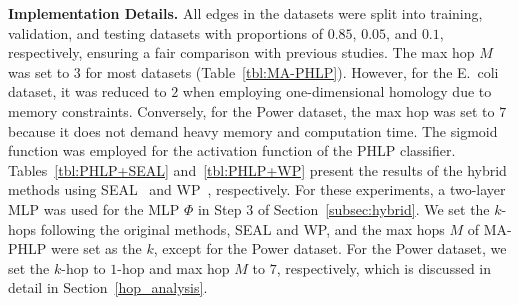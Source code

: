 \noindent\textbf{Implementation Details.} 
All edges in the datasets were split into training, validation, and testing datasets with proportions of $0.85$, $0.05$, and $0.1$, respectively, ensuring a fair comparison with previous studies.
The max hop $M$ was set to $3$ for most datasets (Table~\ref{tbl:MA-PHLP}). 
However, for the E.~coli dataset, it was reduced to $2$ when employing one-dimensional homology due to memory constraints. 
Conversely, for the Power dataset, the max hop was set to $7$ because it does not demand heavy memory and computation time.
The sigmoid function was employed for the activation function of the PHLP classifier.
Tables~\ref{tbl:PHLP+SEAL} and~\ref{tbl:PHLP+WP} present the results of the hybrid methods using SEAL~\cite{zhang2018link} and WP~\cite{pan2021neural}, respectively.
For these experiments, a two-layer MLP was used for the MLP $\Phi$ in Step $3$ of Section~\ref{subsec:hybrid}. 
We set the $k$-hops following the original methods, SEAL and WP, and the max hops $M$ of MA-PHLP were set as the $k$, except for the Power dataset.
For the Power dataset, we set the $k$-hop to $1$-hop and max hop $M$ to $7$, respectively, which is discussed in detail in Section~\ref{hop_analysis}.

